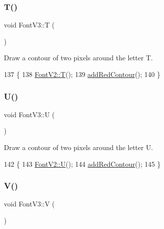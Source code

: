 \subsubsection{\texorpdfstring{T()}{T()}}
{\footnotesize\ttfamily void Font\+V3\+::T (\begin{DoxyParamCaption}{ }\end{DoxyParamCaption})}



Draw a contour of two pixels around the letter T. 


\begin{DoxyCode}
137                \{
138     \mbox{\hyperlink{class_font_v2_a0311eabb37bc231b9b0c0a13cdc0e562}{FontV2::T}}();
139     \mbox{\hyperlink{class_font_v3_a639f1eac0eb6724463813270f47e2696}{addRedContour}}();
140 \}
\end{DoxyCode}
\mbox{\label{class_font_v3_a579b8cfde4219c194d730f3b9e0326aa}} 
\subsubsection{\texorpdfstring{U()}{U()}}
{\footnotesize\ttfamily void Font\+V3\+::U (\begin{DoxyParamCaption}{ }\end{DoxyParamCaption})}



Draw a contour of two pixels around the letter U. 


\begin{DoxyCode}
142                \{
143     \mbox{\hyperlink{class_font_v2_a893e649c0fccfae9d99322fe5e333369}{FontV2::U}}();
144     \mbox{\hyperlink{class_font_v3_a639f1eac0eb6724463813270f47e2696}{addRedContour}}();
145 \}
\end{DoxyCode}
\mbox{\label{class_font_v3_aea95e65e5369e5c28f5867474ac4344a}} 
\subsubsection{\texorpdfstring{V()}{V()}}
{\footnotesize\ttfamily void Font\+V3\+::V (\begin{DoxyParamCaption}{ }\end{DoxyParamCaption})}



